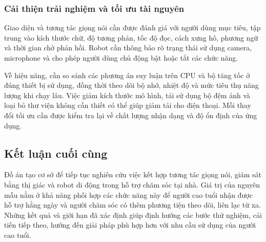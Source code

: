 \subsubsection{Cải thiện trải nghiệm và tối ưu tài nguyên}

Giao diện và tương tác giọng nói cần được đánh giá với người dùng mục tiêu, tập trung vào kích thước chữ, độ tương phản, tốc độ đọc, cách xưng hô, phương ngữ và thời gian chờ phản hồi. Robot cần thông báo rõ trạng thái sử dụng camera, microphone và cho phép người dùng chủ động bật hoặc tắt các chức năng.

Về hiệu năng, cần so sánh các phương án suy luận trên CPU và bộ tăng tốc ở đúng thiết bị sử dụng, đồng thời theo dõi bộ nhớ, nhiệt độ và mức tiêu thụ năng lượng khi chạy lâu. Việc giảm kích thước mô hình, tái sử dụng bộ đệm ảnh và loại bỏ thư viện không cần thiết có thể giúp giảm tải cho điện thoại. Mỗi thay đổi tối ưu cần được kiểm tra lại về chất lượng nhận dạng và độ ổn định của ứng dụng.

\subsection{Kết luận cuối cùng}

Đồ án tạo cơ sở để tiếp tục nghiên cứu việc kết hợp tương tác giọng nói, giám sát bằng thị giác và robot di động trong hỗ trợ chăm sóc tại nhà. Giá trị của nguyên mẫu nằm ở khả năng phối hợp các chức năng này để người cao tuổi nhận được hỗ trợ hằng ngày và người chăm sóc có thêm phương tiện theo dõi, liên lạc từ xa. Những kết quả và giới hạn đã xác định giúp định hướng các bước thử nghiệm, cải tiến tiếp theo, hướng đến giải pháp phù hợp hơn với nhu cầu sử dụng của người cao tuổi.
